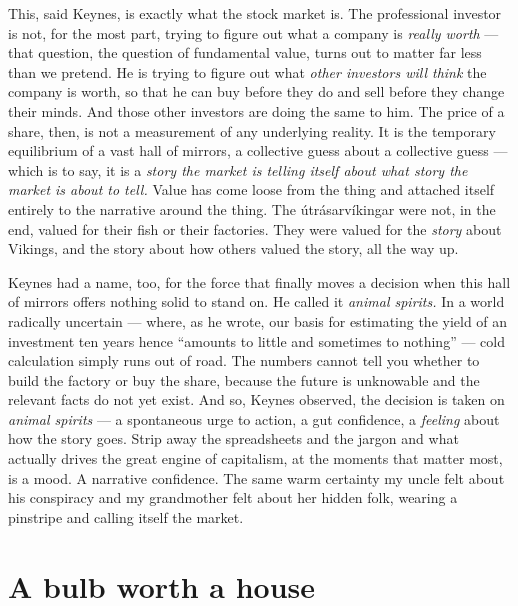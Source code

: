 This, said Keynes, is exactly what the stock market is. The professional investor is not, for the most part, trying to figure out what a company is \emph{really worth} — that question, the question of fundamental value, turns out to matter far less than we pretend. He is trying to figure out what \emph{other investors will think} the company is worth, so that he can buy before they do and sell before they change their minds. And those other investors are doing the same to him. The price of a share, then, is not a measurement of any underlying reality. It is the temporary equilibrium of a vast hall of mirrors, a collective guess about a collective guess — which is to say, it is a \emph{story the market is telling itself about what story the market is about to tell.} Value has come loose from the thing and attached itself entirely to the narrative around the thing. The útrásarvíkingar were not, in the end, valued for their fish or their factories. They were valued for the \emph{story} about Vikings, and the story about how others valued the story, all the way up.

Keynes had a name, too, for the force that finally moves a decision when this hall of mirrors offers nothing solid to stand on. He called it \emph{animal spirits.} In a world radically uncertain — where, as he wrote, our basis for estimating the yield of an investment ten years hence ``amounts to little and sometimes to nothing'' — cold calculation simply runs out of road. The numbers cannot tell you whether to build the factory or buy the share, because the future is unknowable and the relevant facts do not yet exist. And so, Keynes observed, the decision is taken on \emph{animal spirits} — a spontaneous urge to action, a gut confidence, a \emph{feeling} about how the story goes. Strip away the spreadsheets and the jargon and what actually drives the great engine of capitalism, at the moments that matter most, is a mood. A narrative confidence. The same warm certainty my uncle felt about his conspiracy and my grandmother felt about her hidden folk, wearing a pinstripe and calling itself the market.

\section*{A bulb worth a house}

